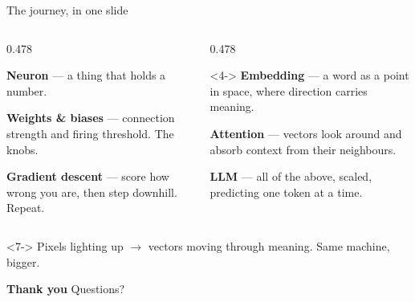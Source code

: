 \documentclass[aspectratio=169,11pt]{beamer}
\begin{document}
\begin{frame}{The journey, in one slide}
  \begin{columns}[T,onlytextwidth]
    \begin{column}{0.478\textwidth}
      \begin{block}{}
        \small
        \textbf{Neuron} --- a thing that holds a number.
        \medskip

        \textbf{Weights \& biases} --- connection strength and firing
        threshold. The knobs.
        \medskip

        \textbf{Gradient descent} --- score how wrong you are, then step
        downhill. Repeat.
      \end{block}
    \end{column}
    \begin{column}{0.478\textwidth}
      \begin{block}<4->{}
        \small
        \textbf{Embedding} --- a word as a point in space, where direction
        carries meaning.
        \medskip

        \textbf{Attention} --- vectors look around and absorb context from
        their neighbours.
        \medskip

        \textbf{LLM} --- all of the above, scaled, predicting one token at a
        time.
      \end{block}
    \end{column}
  \end{columns}
  \medskip
  \begin{exampleblock}<7->{}
    \centering
    Pixels lighting up $\rightarrow$ vectors moving through meaning.
    Same machine, bigger.
  \end{exampleblock}
\end{frame}

\begin{frame}[plain]
  \transfade
  \vfill
  \centering
  {\Huge\bfseries\color{nnblue} Thank you}
  \vskip 8mm
  {\large Questions?}
  \vskip 12mm
  \vfill
\end{frame}
\end{document}
